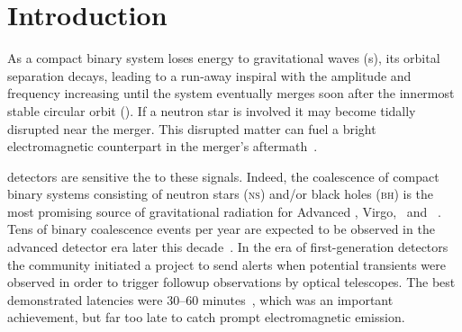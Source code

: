 \section{Introduction}
\label{sec:introduction}


As a compact binary system loses energy to gravitational waves (\GW{}s), its
orbital separation decays, leading to a run-away inspiral with the \GW{}
amplitude and frequency increasing until the system eventually merges soon
after the innermost stable circular orbit (\ISCO). If a neutron star is
involved it may become tidally disrupted near the merger.  This disrupted
matter can fuel a bright electromagnetic counterpart in the merger's
aftermath~\cite{shibata:2007}.

\GW{} detectors are sensitive the to these \GW{}
signals.  Indeed, the coalescence of compact binary systems consisting of
neutron stars (\textsc{ns}) and/or black holes (\textsc{bh}) is the most
promising source of gravitational radiation for Advanced \LIGO, Virgo, \GEO\,
and \LCGT~\cite{ALIGOWeb, AVirgoWeb, GEOWeb, LCGTWeb}.  Tens of binary
coalescence events per year are expected to be observed in the advanced
detector era later this decade~\cite{Abadie:2010p10836}. In the era of
first-generation detectors the \GW{} community initiated a project
to send alerts when potential \GW{} transients were observed in
order to trigger followup observations by optical telescopes.  The best
demonstrated latencies were 30--60 minutes~\cite{HugheyGWPAW2011}, which was an
important achievement, but far too late to catch prompt electromagnetic
emission.

